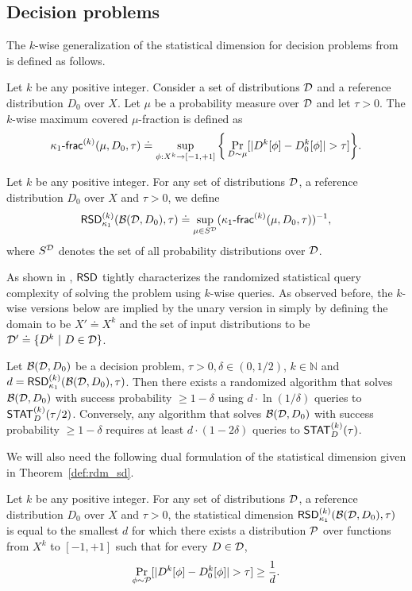 \subsection{Decision problems}
The $k$-wise generalization of the statistical dimension for decision problems from \cite{Feldman:16sqd} is defined as follows.
\begin{defn}
Let $k$ be any positive integer. Consider a set of distributions $\mathcal{D}$ and a reference distribution $D_0$ over $X$. Let $\mu$ be a probability measure over $\mathcal{D}$ and let $\tau > 0$. The $k$-wise maximum covered $\mu$-fraction is defined as
$$ \kappa_1\text{-}\mathsf{frac}^{(k)}(\mu,D_0,\tau) \doteq \sup_{\phi: X^k \to [-1,+1]} \bigg\{ \Pr_{D \sim \mu}[|D^k[\phi]-D_0^k[\phi]| > \tau] \bigg\}. $$
\end{defn}
\begin{defn}\label{def:rdm_sd}
Let $k$ be any positive integer. For any set of distributions $\mathcal{D}$, a reference distribution $D_0$ over $X$ and $\tau > 0$, we define
$$ \mathsf{RSD}_{\kappa_1}^{(k)}(\mathcal{B}(\mathcal{D},D_0), \tau) \doteq \sup_{\mu \in S^{\mathcal{D}}} ( \kappa_1\text{-}\mathsf{frac}^{(k)}(\mu,D_0,\tau))^{-1}, $$
where $S^{\mathcal{D}}$ denotes the set of all probability distributions over $\mathcal{D}$.
\end{defn}

As shown in \cite{Feldman:16sqd}, $\mathsf{RSD}$ tightly characterizes the randomized statistical query complexity of solving the problem using $k$-wise queries. As observed before, the $k$-wise versions below are implied by the unary version in \cite{Feldman:16sqd} simply by defining the domain to be $X' \doteq X^k$ and the set of input distributions to be $\mathcal{D}' \doteq \{D^k \ |\  D \in \mathcal{D}\}$.

\begin{theorem}\label{thm:random-algorithm2queries}
Let $\mathcal{B}(\mathcal{D},D_0)$ be a decision problem, $\tau > 0, \delta \in (0,1/2)$, $k \in \mathbb{N}$ and $d=\mathsf{RSD}^{(k)}_{\kappa_1}(\mathcal{B}(\mathcal{D},D_0),\tau)$. Then there exists a randomized algorithm that solves $\mathcal{B}(\mathcal{D},D_0)$ with success probability $\geq 1-\delta$ using $d \cdot \ln(1/\delta)$ queries to $\mathsf{STAT}^{(k)}_D(\tau/2)$. Conversely, any algorithm that solves $\mathcal{B}(\mathcal{D},D_0)$ with success probability $\geq 1-\delta$ requires at least $d \cdot (1-2\delta)$ queries to $\mathsf{STAT}^{(k)}_D(\tau)$.
\end{theorem}

We will also need the following dual formulation of the statistical dimension given in Theorem~\ref{def:rdm_sd}.
\begin{lem}\label{fa:rcvr}
Let $k$ be any positive integer. For any set of distributions $\mathcal{D}$, a reference distribution $D_0$ over $X$ and $\tau > 0$,  the statistical dimension $\mathsf{RSD}_{\kappa_1}^{(k)}(\mathcal{B}(\mathcal{D},D_0), \tau)$ is equal to the smallest $d$ for which there exists a distribution $\mathcal{P}$ over functions from $X^k$ to $[-1,+1]$ such that for every $D \in \mathcal{D}$,
$$ \Pr_{\phi \sim \mathcal{P}}[|D^k[\phi]-D_0^k[\phi]| > \tau] \geq \frac{1}{d}.$$
\end{lem}

